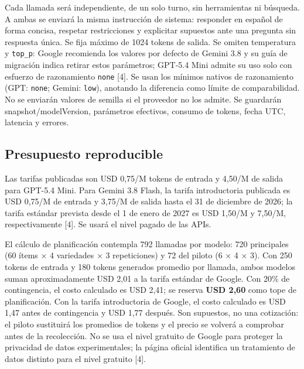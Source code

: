 \documentclass[conference]{IEEEtran}
\begin{document}
Cada llamada será independiente, de un solo turno, sin herramientas ni búsqueda. A ambas se enviará la misma instrucción de sistema: responder en español de forma concisa, respetar restricciones y explicitar supuestos ante una pregunta sin respuesta única. Se fija máximo de 1024 tokens de salida. Se omiten temperatura y \texttt{top\_p}: Google recomienda los valores por defecto de Gemini 3.8 y su guía de migración indica retirar estos parámetros; GPT-5.4 Mini admite su uso solo con esfuerzo de razonamiento \texttt{none} [4]. Se usan los mínimos nativos de razonamiento (GPT: \texttt{none}; Gemini: \texttt{low}), anotando la diferencia como límite de comparabilidad. No se enviarán valores de semilla si el proveedor no los admite. Se guardarán snapshot/modelVersion, parámetros efectivos, consumo de tokens, fecha UTC, latencia y errores.

\subsection{Presupuesto reproducible}
Las tarifas publicadas son USD 0,75/M tokens de entrada y 4,50/M de salida para GPT-5.4 Mini. Para Gemini 3.8 Flash, la tarifa introductoria publicada es USD 0,75/M de entrada y 3,75/M de salida hasta el 31 de diciembre de 2026; la tarifa estándar prevista desde el 1 de enero de 2027 es USD 1,50/M y 7,50/M, respectivamente [4]. Se usará el nivel pagado de las APIs.

El cálculo de planificación contempla 792 llamadas por modelo: 720 principales (60 ítems × 4 variedades × 3 repeticiones) y 72 del piloto (6 × 4 × 3). Con 250 tokens de entrada y 180 tokens generados promedio por llamada, ambos modelos suman aproximadamente USD 2,01 a la tarifa estándar de Google. Con 20\% de contingencia, el costo calculado es USD 2,41; se reserva \textbf{USD 2,60} como tope de planificación. Con la tarifa introductoria de Google, el costo calculado es USD 1,47 antes de contingencia y USD 1,77 después. Son supuestos, no una cotización: el piloto sustituirá los promedios de tokens y el precio se volverá a comprobar antes de la recolección. No se usa el nivel gratuito de Google para proteger la privacidad de datos experimentales; la página oficial identifica un tratamiento de datos distinto para el nivel gratuito [4].
\end{document}
